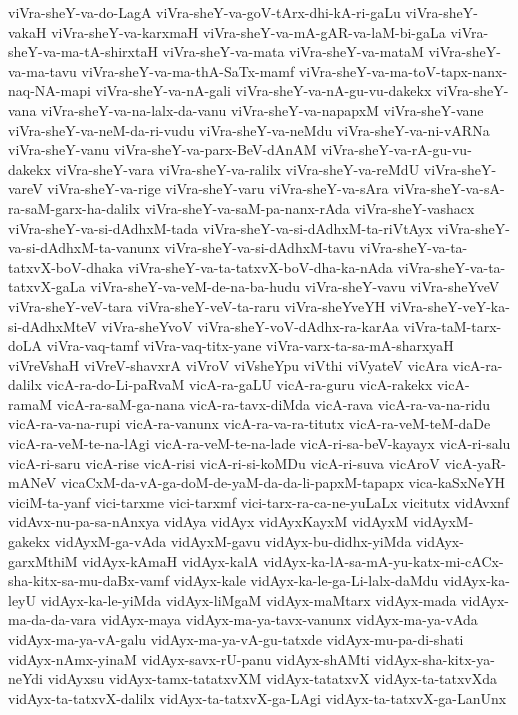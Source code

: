 {viVra-sheY-va-do-LagA
viVra-sheY-va-goV-tArx-dhi-kA-ri-gaLu
viVra-sheY-vakaH
viVra-sheY-va-karxmaH
viVra-sheY-va-mA-gAR-va-laM-bi-gaLa
viVra-sheY-va-ma-tA-shirxtaH
viVra-sheY-va-mata
viVra-sheY-va-mataM
viVra-sheY-va-ma-tavu
viVra-sheY-va-ma-thA-SaTx-mamf
viVra-sheY-va-ma-toV-tapx-nanx-naq-NA-mapi
viVra-sheY-va-nA-gali
viVra-sheY-va-nA-gu-vu-dakekx
viVra-sheY-vana
viVra-sheY-va-na-lalx-da-vanu
viVra-sheY-va-napapxM
viVra-sheY-vane
viVra-sheY-va-neM-da-ri-vudu
viVra-sheY-va-neMdu
viVra-sheY-va-ni-vARNa
viVra-sheY-vanu
viVra-sheY-va-parx-BeV-dAnAM
viVra-sheY-va-rA-gu-vu-dakekx
viVra-sheY-vara
viVra-sheY-va-ralilx
viVra-sheY-va-reMdU
viVra-sheY-vareV
viVra-sheY-va-rige
viVra-sheY-varu
viVra-sheY-va-sAra
viVra-sheY-va-sA-ra-saM-garx-ha-dalilx
viVra-sheY-va-saM-pa-nanx-rAda
viVra-sheY-vashacx
viVra-sheY-va-si-dAdhxM-tada
viVra-sheY-va-si-dAdhxM-ta-riVtAyx
viVra-sheY-va-si-dAdhxM-ta-vanunx
viVra-sheY-va-si-dAdhxM-tavu
viVra-sheY-va-ta-tatxvX-boV-dhaka
viVra-sheY-va-ta-tatxvX-boV-dha-ka-nAda
viVra-sheY-va-ta-tatxvX-gaLa
viVra-sheY-va-veM-de-na-ba-hudu
viVra-sheY-vavu
viVra-sheYveV
viVra-sheY-veV-tara
viVra-sheY-veV-ta-raru
viVra-sheYveYH
viVra-sheY-veY-ka-si-dAdhxMteV
viVra-sheYvoV
viVra-sheY-voV-dAdhx-ra-karAa
viVra-taM-tarx-doLA
viVra-vaq-tamf
viVra-vaq-titx-yane
viVra-varx-ta-sa-mA-sharxyaH
viVreVshaH
viVreV-shavxrA
viVroV
viVsheYpu
viVthi
viVyateV
vicAra
vicA-ra-dalilx
vicA-ra-do-Li-paRvaM
vicA-ra-gaLU
vicA-ra-guru
vicA-rakekx
vicA-ramaM
vicA-ra-saM-ga-nana
vicA-ra-tavx-diMda
vicA-rava
vicA-ra-va-na-ridu
vicA-ra-va-na-rupi
vicA-ra-vanunx
vicA-ra-va-ra-titutx
vicA-ra-veM-teM-daDe
vicA-ra-veM-te-na-lAgi
vicA-ra-veM-te-na-lade
vicA-ri-sa-beV-kayayx
vicA-ri-salu
vicA-ri-saru
vicA-rise
vicA-risi
vicA-ri-si-koMDu
vicA-ri-suva
vicAroV
vicA-yaR-mANeV
vicaCxM-da-vA-ga-doM-de-yaM-da-da-li-papxM-tapapx
vica-kaSxNeYH
viciM-ta-yanf
vici-tarxme
vici-tarxmf
vici-tarx-ra-ca-ne-yuLaLx
vicitutx
vidAvxnf
vidAvx-nu-pa-sa-nAnxya
vidAya
vidAyx
vidAyxKayxM
vidAyxM
vidAyxM-gakekx
vidAyxM-ga-vAda
vidAyxM-gavu
vidAyx-bu-didhx-yiMda
vidAyx-garxMthiM
vidAyx-kAmaH
vidAyx-kalA
vidAyx-ka-lA-sa-mA-yu-katx-mi-cACx-sha-kitx-sa-mu-daBx-vamf
vidAyx-kale
vidAyx-ka-le-ga-Li-lalx-daMdu
vidAyx-ka-leyU
vidAyx-ka-le-yiMda
vidAyx-liMgaM
vidAyx-maMtarx
vidAyx-mada
vidAyx-ma-da-da-vara
vidAyx-maya
vidAyx-ma-ya-tavx-vanunx
vidAyx-ma-ya-vAda
vidAyx-ma-ya-vA-galu
vidAyx-ma-ya-vA-gu-tatxde
vidAyx-mu-pa-di-shati
vidAyx-nAmx-yinaM
vidAyx-savx-rU-panu
vidAyx-shAMti
vidAyx-sha-kitx-ya-neYdi
vidAyxsu
vidAyx-tamx-tatatxvXM
vidAyx-tatatxvX
vidAyx-ta-tatxvXda
vidAyx-ta-tatxvX-dalilx
vidAyx-ta-tatxvX-ga-LAgi
vidAyx-ta-tatxvX-ga-LanUnx
}
